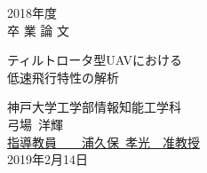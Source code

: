 \newcommand{\hdate}[1]{\setcounter{page}{0}\begin{center}{\LARGE
#1\\}\vskip 20pt {\Huge 卒 業 論 文}\end{center}\vskip 40pt}

\newcommand{\htitle}[1]{
        \begin{center}
                \vskip 16pt
                {\LARGE #1}\\
                \setlength{\unitlength}{1mm}
        \end{center}
        \vskip 40pt
}

\begin{titlepage}
\vspace*{2cm}
\hdate{2018年度}
\htitle{ティルトロータ型UAVにおける\\低速飛行特性の解析}

\hspace{8cm}
\begin{center}
\Large
神戸大学工学部情報知能工学科\\
\vskip 20pt
弓場~洋輝\\
\vskip 40pt
\underline{指導教員~~~~{\Large 浦久保~孝光~~准教授}}\\
\vskip 20pt
2019年2月14日
\end{center}
\end{titlepage}
